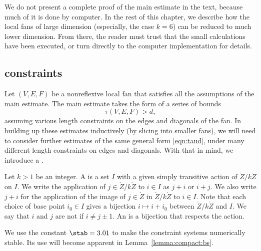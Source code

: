 We do not present a complete proof of the main estimate in the text,
because much of it is done by computer.  In the rest of this chapter,
we describe how the local fans of large dimension (especially, the case $k=6$)
can be reduced to much lower dimension.  From there, the reader must
trust that the small calculations have been executed, or turn directly to
the computer implementation for details.

\subsection{constraints}

Let $(V,E,F)$ be a nonreflexive local fan that satisfies all the assumptions
of the main estimate.  The main estimate takes the form of a series of
bounds
\begin{equation}\label{eqn:taud}
\tau(V,E,F) > d,
\end{equation}
assuming various length constraints on the edges and diagonals of the fan.
In building up these estimates inductively (by slicing into
smaller fans), we will need to consider further estimates of the same
general form \eqref{eqn:taud}, under many different length constraints on
edges and diagonals.
With that in mind, we introduce a .
%

\begin{definition}
  Let $k>1$ be an integer.  A  is a set $I$ with a
  given simply transitive action of $\ring{Z}/k\ring{Z}$ on $I$.  We
  write the application of $j\in\ring{Z}/k\ring{Z}$ to $i\in I$ as
  $j+i$ or $i+j$.  We also write $j+i$
  for the application of the image of $j\in\ring{Z}$ in $\ring{Z}/k\ring{Z}$ to
  $i\in I$.  Note that each choice of base point $i_0\in I$ gives a
  bijection $i\mapsto i+i_0$ between $\ring{Z}/k\ring{Z}$ and $I$.  
  We say that $i$ and $j$ are not  if $i\ne j\pm 1$.
  An
 is a bijection that respects the action.
%
\end{definition}

We use the constant $\stab=3.01$ to make the constraint systems
numerically stable.  Its use will become apparent in
Lemma~\ref{lemma:compact:bs}.  
%
%


